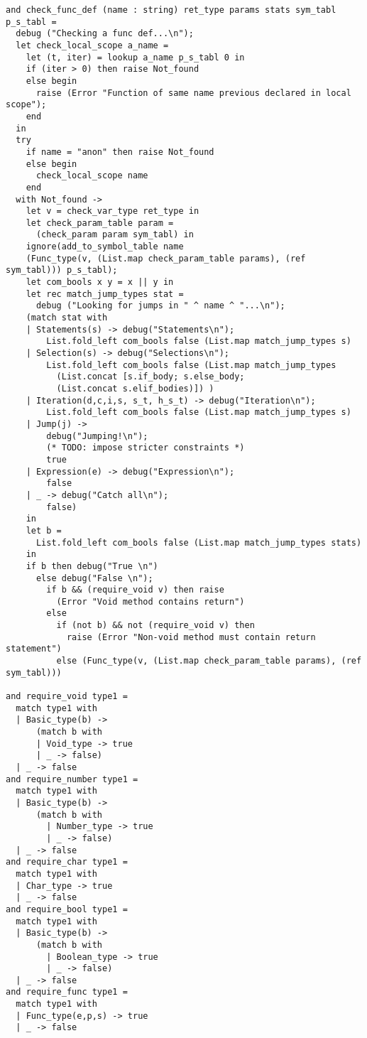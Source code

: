 \begin{verbatim}
and check_func_def (name : string) ret_type params stats sym_tabl p_s_tabl =
  debug ("Checking a func def...\n");
  let check_local_scope a_name =
    let (t, iter) = lookup a_name p_s_tabl 0 in
    if (iter > 0) then raise Not_found
    else begin
      raise (Error "Function of same name previous declared in local scope");
    end
  in
  try
    if name = "anon" then raise Not_found
    else begin
      check_local_scope name
    end
  with Not_found ->
    let v = check_var_type ret_type in
    let check_param_table param =
      (check_param param sym_tabl) in
    ignore(add_to_symbol_table name
    (Func_type(v, (List.map check_param_table params), (ref sym_tabl))) p_s_tabl);
    let com_bools x y = x || y in
    let rec match_jump_types stat =
      debug ("Looking for jumps in " ^ name ^ "...\n");
    (match stat with
    | Statements(s) -> debug("Statements\n");
        List.fold_left com_bools false (List.map match_jump_types s)
    | Selection(s) -> debug("Selections\n");
        List.fold_left com_bools false (List.map match_jump_types
          (List.concat [s.if_body; s.else_body;
          (List.concat s.elif_bodies)]) )
    | Iteration(d,c,i,s, s_t, h_s_t) -> debug("Iteration\n");
        List.fold_left com_bools false (List.map match_jump_types s)
    | Jump(j) ->
        debug("Jumping!\n");
        (* TODO: impose stricter constraints *)
        true
    | Expression(e) -> debug("Expression\n");
        false
    | _ -> debug("Catch all\n");
        false)
    in
    let b =
      List.fold_left com_bools false (List.map match_jump_types stats)
    in
    if b then debug("True \n")
      else debug("False \n");
        if b && (require_void v) then raise
          (Error "Void method contains return")
        else
          if (not b) && not (require_void v) then
            raise (Error "Non-void method must contain return statement")
          else (Func_type(v, (List.map check_param_table params), (ref sym_tabl)))

and require_void type1 =
  match type1 with
  | Basic_type(b) ->
      (match b with
      | Void_type -> true
      | _ -> false)
  | _ -> false
and require_number type1 =
  match type1 with
  | Basic_type(b) ->
      (match b with
        | Number_type -> true
        | _ -> false)
  | _ -> false
and require_char type1 =
  match type1 with
  | Char_type -> true
  | _ -> false
and require_bool type1 =
  match type1 with
  | Basic_type(b) ->
      (match b with
        | Boolean_type -> true
        | _ -> false)
  | _ -> false
and require_func type1 =
  match type1 with
  | Func_type(e,p,s) -> true
  | _ -> false


\end{verbatim}
